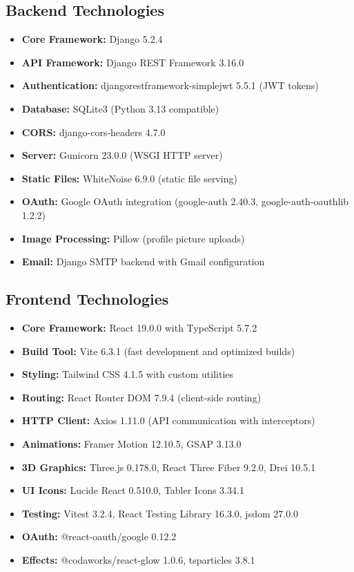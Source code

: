 \documentclass[11pt,a4paper]{article}
\begin{document}
\subsection{Backend Technologies}
\begin{itemize}[leftmargin=*]
    \item \textbf{Core Framework:} Django 5.2.4
    \item \textbf{API Framework:} Django REST Framework 3.16.0
    \item \textbf{Authentication:} djangorestframework-simplejwt 5.5.1 (JWT tokens)
    \item \textbf{Database:} SQLite3 (Python 3.13 compatible)
    \item \textbf{CORS:} django-cors-headers 4.7.0
    \item \textbf{Server:} Gunicorn 23.0.0 (WSGI HTTP server)
    \item \textbf{Static Files:} WhiteNoise 6.9.0 (static file serving)
    \item \textbf{OAuth:} Google OAuth integration (google-auth 2.40.3, google-auth-oauthlib 1.2.2)
    \item \textbf{Image Processing:} Pillow (profile picture uploads)
    \item \textbf{Email:} Django SMTP backend with Gmail configuration
\end{itemize}

\subsection{Frontend Technologies}
\begin{itemize}[leftmargin=*]
    \item \textbf{Core Framework:} React 19.0.0 with TypeScript 5.7.2
    \item \textbf{Build Tool:} Vite 6.3.1 (fast development and optimized builds)
    \item \textbf{Styling:} Tailwind CSS 4.1.5 with custom utilities
    \item \textbf{Routing:} React Router DOM 7.9.4 (client-side routing)
    \item \textbf{HTTP Client:} Axios 1.11.0 (API communication with interceptors)
    \item \textbf{Animations:} Framer Motion 12.10.5, GSAP 3.13.0
    \item \textbf{3D Graphics:} Three.js 0.178.0, React Three Fiber 9.2.0, Drei 10.5.1
    \item \textbf{UI Icons:} Lucide React 0.510.0, Tabler Icons 3.34.1
    \item \textbf{Testing:} Vitest 3.2.4, React Testing Library 16.3.0, jsdom 27.0.0
    \item \textbf{OAuth:} @react-oauth/google 0.12.2
    \item \textbf{Effects:} @codaworks/react-glow 1.0.6, tsparticles 3.8.1
\end{itemize}
\end{document}
